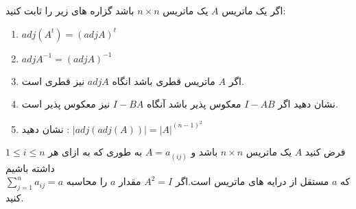 \documentclass{article}
\begin{document}
اگر یک ماتریس 
$A$
یک ماتریس 
$n\times n $
باشد 
گزاره های زیر را ثابت کنید:
\begin{enumerate}
\item 
	$adj(A^t)=(adj A)^t$
\item 
$adj  A^{-1}=(adj A)^{-1}$
\item 
اگر 
$A$
ماتریس قطری باشد انگاه 
$adj A$
نیز قطری است.
\item 
نشان دهید اگر 
$I-AB$
معکوس پذیر باشد آنگاه 
$I-BA$
نیز معکوس پذیر است.
\item 
نشان دهید :
$|adj(adj(A))|=|A|^{(n-1)^2}$
	
\end{enumerate}
فرض کنید 
$A$
یک ماتریس 
$n\times n$
باشد و 
$A=a_{(ij)}$
به طوری که 
به ازای هر 
$1\leq i\leq n $
داشته باشیم 
\\
$\sum_{j=1}^{n}a_{ij}=a$
که 
$a$
مستقل از درایه های ماتریس است.اگر 
$A^2=I$
مقدار 
$a$
را محاسبه کنید.
\end{document}
